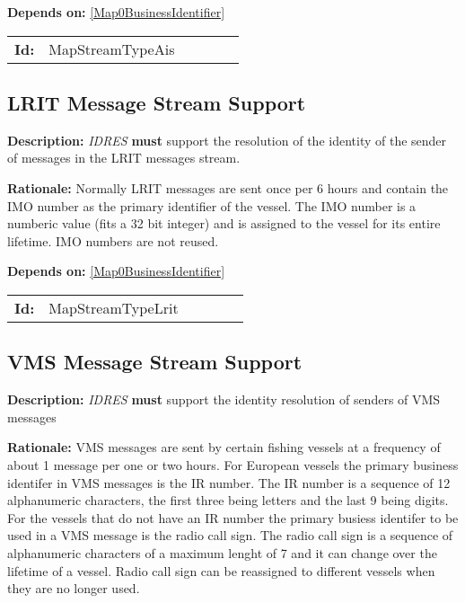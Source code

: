 \textbf{Depends on:} \ref{Map0BusinessIdentifier} 

\par
{\small \begin{center}\begin{tabular}{rlrlrl}
\textbf{Id:} & MapStreamTypeAis  & & & \end{tabular}\end{center} }

\subsection{LRIT Message Stream Support}\label{MapStreamTypeLrit}
\textbf{Description:} \textsl{IDRES} \textbf{must} support the resolution of the  identity of the sender of messages in the LRIT messages stream.

\textbf{Rationale:} Normally LRIT messages are sent once per 6 hours and contain the IMO number as the primary identifier of the vessel. The IMO number is  a numberic value (fits a 32 bit integer) and is assigned to the  vessel for its entire lifetime. IMO numbers are not reused.

\textbf{Depends on:} \ref{Map0BusinessIdentifier} 

\par
{\small \begin{center}\begin{tabular}{rlrlrl}
\textbf{Id:} & MapStreamTypeLrit  & & & \end{tabular}\end{center} }

\subsection{VMS Message Stream Support}\label{MapStreamTypeVms}
\textbf{Description:} \textsl{IDRES} \textbf{must} support the identity resolution of senders of VMS messages

\textbf{Rationale:} VMS messages are sent by certain fishing vessels at a frequency  of about 1 message per one or two hours. For European vessels the primary business identifer in VMS messages is the IR number. The IR number is  a sequence of 12 alphanumeric characters, the first three being letters and the last 9 being digits. For the vessels that do not have an IR number the primary busiess identifer to be used in a VMS message is the radio  call sign. The radio call sign is a sequence of alphanumeric characters of a maximum lenght of 7 and it can change over the lifetime of a vessel. Radio call sign can be reassigned to different vessels when they are no  longer used. 

